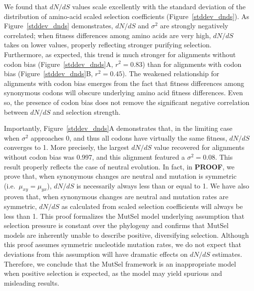 \documentclass{pnastwo}
\begin{document}
\begin{article}
We found that $dN/dS$ values scale excellently with the standard deviation of the distribution of amino-acid scaled selection coefficients (Figure~\ref{stddev_dnds}). As Figure~\ref{stddev_dnds} demonstrates, $dN/dS$ and $\sigma^2$ are strongly negatively correlated; when fitness differences among amino acids are very high, $dN/dS$ takes on lower values, properly reflecting stronger purifying selection. Furthermore, as expected, this trend is much stronger for alignments without codon bias (Figure~\ref{stddev_dnds}A, $r^2 = 0.83$) than for alignments with codon bias (Figure~\ref{stddev_dnds}B, $r^2 = 0.45$). The weakened relationship for alignments with codon bias emerges from the fact that fitness differences among synonymous codons will obscure underlying amino acid fitness differences. Even so, the presence of codon bias does not remove the significant negative correlation between $dN/dS$ and selection strength.
		
Importantly, Figure~\ref{stddev_dnds}A demonstrates that, in the limiting case when $\sigma^2$ approaches 0, and thus all codons have virtually the same fitness, $dN/dS$ converges to 1. More precisely, the largest $dN/dS$ value recovered for alignments without codon bias was 0.997, and this alignment featured a $\sigma^2 = 0.08$. This result properly reflects the case of neutral evolution. In fact, in \textbf{PROOF}, we prove that, when synonymous changes are neutral and mutation is symmetric (i.e.\ $\mu_{xy} = \mu_{yx}$), $dN/dS$ is necessarily always less than or equal to 1. We have also proven that, when synonymous changes are neutral and mutation rates are symmetric, $dN/dS$ as calculated from scaled selection coefficients will always be less than 1. This proof formalizes the MutSel model underlying assumption that selection pressure is constant over the phylogeny and confirms that MutSel models are inherently unable to describe positive, diversifying selection. Although this proof assumes symmetric nucleotide mutation rates, we do not expect that deviations from this assumption will have dramatic effects on $dN/dS$ estimates. Therefore, we conclude that the MutSel framework is an inappropriate model when positive selection is expected, as the model may yield spurious and misleading results. 


\end{article}
\end{document}
